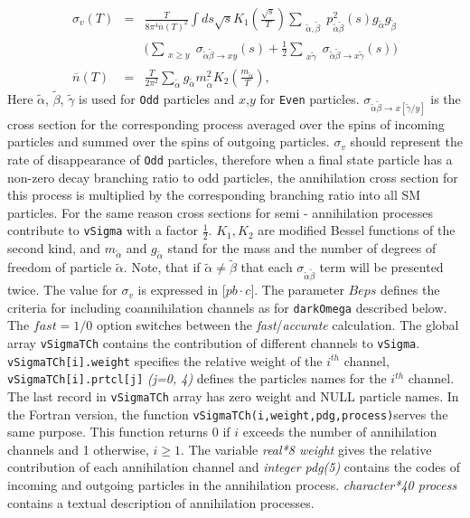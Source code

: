 \documentclass[12pt,a4paper]{article}
\begin{document}
\begin{eqnarray}
\nonumber
\sigma_v(T) &=& \frac{T}{8\pi^4  \overline{n}(T)^2} \int ds\sqrt{s} K_1\left(\frac{\sqrt{s}}{T}\right)   
\sum_{\substack{
\tilde\alpha ,\tilde\beta }}  p_{\tilde\alpha\tilde\beta}^2(s) g_{\tilde\alpha} g_{\tilde\beta} \\
&&\big(
\sum_{\substack{ x \ge y }}  
 {\sigma}_{\tilde\alpha\tilde\beta\to x y}(s)+ \frac{1}{2}\sum_{\substack{x  \tilde\gamma }}
 {\sigma}_{\tilde\alpha\tilde\beta\to x\tilde\gamma}(s)
  \big)
\label{sigmaV}\\
\overline{n}(T)&=&\frac{T}{2\pi^2 } \sum_{\tilde\alpha} g_{\tilde\alpha} m^2_{\tilde\alpha} K_2(\frac{m_{\tilde\alpha}}{T}),
\end{eqnarray}
Here  $\tilde\alpha$, $\tilde\beta$, $\tilde\gamma$  is used for  {\tt Odd} particles and $x$,$y$
for {\tt Even}  particles.    ${\sigma}_{\tilde\alpha\tilde\beta\to x[\tilde\gamma/y]} $ is the cross section for the 
corresponding  process  averaged over the spins of incoming particles and summed
over the spins of outgoing particles. $\sigma_v$  should represent the rate of disappearance  of  {\tt Odd} particles, therefore
when a final state particle has a non-zero decay branching ratio to odd particles, the  annihilation cross section for this process is multiplied by the corresponding branching ratio into all SM particles. For the same reason cross sections for  semi - annihilation processes  contribute to {\tt vSigma} with a factor $\frac{1}{2}$. $K_1,K_2$ are modified Bessel functions of the second kind, and 
$m_{\tilde\alpha}$ and $g_{\tilde\alpha}$ stand for the  mass and the number of degrees of freedom of particle $\tilde\alpha$.
Note, that if $\tilde\alpha \ne \tilde\beta$ that each
${\sigma}_{\tilde\alpha\tilde\beta}$ term will be presented  twice.
The value for $\sigma_v$ 
is expressed in [$pb\cdot c$].  The parameter $Beps$ defines the criteria for including coannihilation
channels as for {\tt darkOmega} described below.
The $fast=1/0$ option switches between the {\it fast}/{\it accurate} calculation. 
The global array {\tt vSigmaTCh} contains the 
contribution of different channels to {\tt vSigma}. \verb|vSigmaTCh[i].weight| specifies the relative
weight of the $i^{th}$ channel, \\
\verb|vSigmaTCh[i].prtcl[j]|  {\it (j=0, 4)}  defines the particles names for the $i^{th}$
channel.\\
The last record in \verb|vSigmaTCh| array has zero weight and 
NULL particle names.  In the Fortran version, the function 
 \verb|vSigmaTCh(i,weight,pdg,process)|serves the same purpose.  This function returns 0
if $i$  exceeds the number of annihilation  channels and 1 otherwise, $i\ge 1$. 
 The variable {\it real*8 weight} gives the relative contribution of each
annihilation channel and {\it integer pdg(5)} contains the codes of incoming and
outgoing particles in the  annihilation process.  {\it character*40  process}
contains a textual description of annihilation processes.\\
\end{document}
